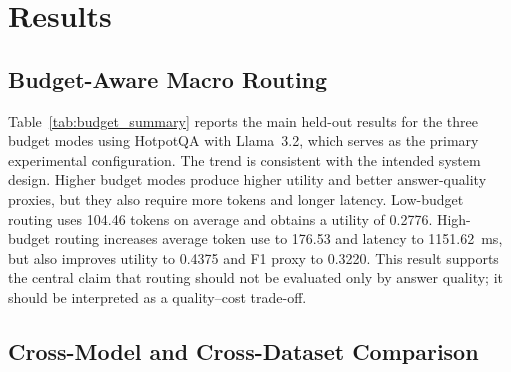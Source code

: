 \documentclass[12pt,a4paper]{article}
\begin{document}
\section{Results}

\subsection{Budget-Aware Macro Routing}

Table~\ref{tab:budget_summary} reports the main held-out results for the three budget modes using HotpotQA with Llama~3.2, which serves as the primary experimental configuration. The trend is consistent with the intended system design. Higher budget modes produce higher utility and better answer-quality proxies, but they also require more tokens and longer latency. Low-budget routing uses 104.46 tokens on average and obtains a utility of 0.2776. High-budget routing increases average token use to 176.53 and latency to 1151.62~ms, but also improves utility to 0.4375 and F1 proxy to 0.3220. This result supports the central claim that routing should not be evaluated only by answer quality; it should be interpreted as a quality--cost trade-off.

\begin{table}[H]
\centering
\caption{Budget-aware macro routing on HotpotQA with Llama~3.2 (primary configuration).}
\label{tab:budget_summary}
\end{table}

\subsection{Cross-Model and Cross-Dataset Comparison}
\end{document}
